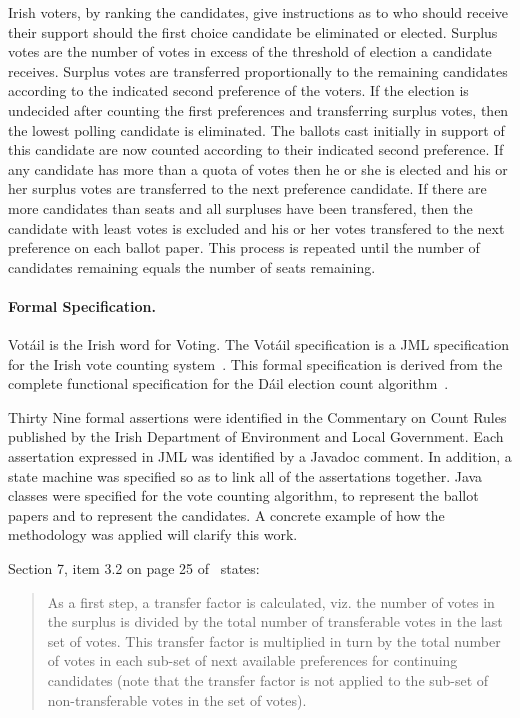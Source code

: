 \documentclass[times, 10pt, twocolumn]{article}
\newcommand{\Votail}{Vot{\'a}il\xspace}
\begin{document}
Irish voters, by ranking the candidates, give instructions as to who should 
receive their support should the first choice candidate be eliminated or 
elected. Surplus votes are the number of votes in excess of the threshold of 
election a candidate receives. Surplus votes are transferred proportionally to 
the remaining candidates according to the indicated second preference of the 
voters. If the election is undecided after counting the first preferences and 
transferring surplus votes, then the lowest polling candidate is eliminated. 
The ballots cast initially in support of this candidate are now counted 
according to their indicated second preference. If any candidate has more than 
a quota of votes then he or she is elected and his or her surplus votes are 
transferred to the next preference candidate.  If there are more candidates 
than seats and all surpluses have been transfered, then the candidate with 
least votes is excluded and his or her votes transfered to the next preference 
on each ballot paper.  This process is repeated until the number of candidates 
remaining equals the number of seats remaining.

\paragraph{Formal Specification.} %

\Votail is the Irish word for Voting.  The \Votail specification is a JML 
specification for the Irish vote counting system~\cite{Cochran06}.  This formal 
specification is derived from the complete functional specification for the 
D{\'a}il election count algorithm~\cite{CEV00,CEV02}.

Thirty Nine formal assertions were identified in the Commentary on Count Rules 
published by the Irish Department of Environment and Local Government. Each 
assertation expressed in JML was identified by a Javadoc comment. In addition, a 
state machine was specified so as to link all of the assertations together. 
Java classes were specified for the vote counting algorithm, to represent the 
ballot papers and to represent the candidates. A concrete example of how the 
methodology was applied will clarify this work.

Section 7, item 3.2 on page 25 of~\cite{CEV00} states:
\begin{quote}
As a first step, a transfer factor is calculated, viz. the number of votes in 
the surplus is divided by the total number of transferable votes in the last 
set of votes. This transfer factor is multiplied in turn by the total number of 
votes in each sub-set of next available preferences for continuing candidates 
(note that the transfer factor is not applied to the sub-set of 
non-transferable votes in the set of votes).
\end{quote}
\end{document}
